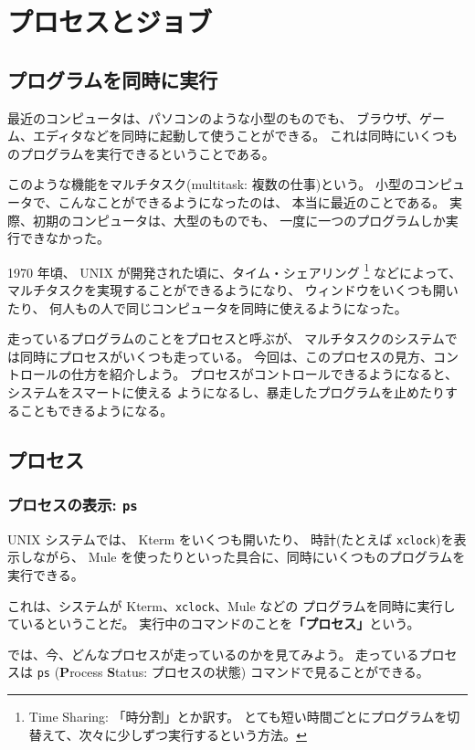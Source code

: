 \chapter{プロセスとジョブ}

\section*{プログラムを同時に実行}

最近のコンピュータは、パソコンのような小型のものでも、
ブラウザ、ゲーム、エディタなどを同時に起動して使うことができる。
これは同時にいくつものプログラムを実行できるということである。

このような機能をマルチタスク(multitask: 複数の仕事)という。
小型のコンピュータで、こんなことができるようになったのは、
本当に最近のことである。
実際、初期のコンピュータは、大型のものでも、
一度に一つのプログラムしか実行できなかった。

1970 年頃、 UNIX が開発された頃に、タイム・シェアリング
\footnote{Time Sharing: 「時分割」とか訳す。
とても短い時間ごとにプログラムを切替えて、次々に少しずつ実行するという方法。}
などによって、
マルチタスクを実現することができるようになり、
ウィンドウをいくつも開いたり、
何人もの人で同じコンピュータを同時に使えるようになった。

走っているプログラムのことをプロセスと呼ぶが、
マルチタスクのシステムでは同時にプロセスがいくつも走っている。
今回は、このプロセスの見方、コントロールの仕方を紹介しよう。
プロセスがコントロールできるようになると、システムをスマートに使える
ようになるし、暴走したプログラムを止めたりすることもできるようになる。

\section{プロセス}

\subsection{プロセスの表示: \texttt{ps}}

 UNIX システムでは、 Kterm をいくつも開いたり、
時計(たとえば \texttt{xclock})を表示しながら、
 Mule を使ったりといった具合に、同時にいくつものプログラムを実行できる。

これは、システムが Kterm、\texttt{xclock}、Mule などの
プログラムを同時に実行しているということだ。
実行中のコマンドのことを\textbf{「プロセス」}という。

では、今、どんなプロセスが走っているのかを見てみよう。
走っているプロセスは \texttt{ps}
(\textbf{P}rocess \textbf{S}tatus: プロセスの状態) コマンドで見ることができる。

